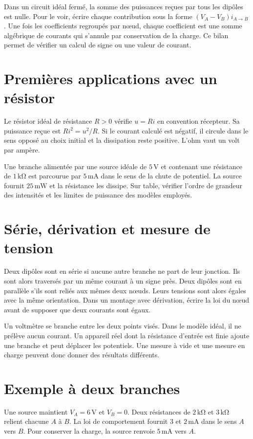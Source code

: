 \documentclass[11pt,a4paper]{article}
\begin{document}
Dans un circuit idéal fermé, la somme des puissances reçues par tous les dipôles est nulle. Pour le voir, écrire chaque contribution sous la forme $(V_A-V_B)i_{A\to B}$. Une fois les coefficients regroupés par nœud, chaque coefficient est une somme algébrique de courants qui s’annule par conservation de la charge. Ce bilan permet de vérifier un calcul de signe ou une valeur de courant.

\section*{Premières applications avec un résistor}
Le résistor idéal de résistance $R>0$ vérifie $u=Ri$ en convention récepteur. Sa puissance reçue est $Ri^2=u^2/R$. Si le courant calculé est négatif, il circule dans le sens opposé au choix initial et la dissipation reste positive. L’ohm vaut un volt par ampère.

Une branche alimentée par une source idéale de $5\,\mathrm V$ et contenant une résistance de $1\,\mathrm{k\Omega}$ est parcourue par $5\,\mathrm{mA}$ dans le sens de la chute de potentiel. La source fournit $25\,\mathrm{mW}$ et la résistance les dissipe. Sur table, vérifier l’ordre de grandeur des intensités et les limites de puissance des modèles employés.

\section*{Série, dérivation et mesure de tension}
Deux dipôles sont en série si aucune autre branche ne part de leur jonction. Ils sont alors traversés par un même courant à un signe près. Deux dipôles sont en parallèle s’ils sont reliés aux mêmes deux nœuds. Leurs tensions sont alors égales avec la même orientation. Dans un montage avec dérivation, écrire la loi du nœud avant de supposer que deux courants sont égaux.

Un voltmètre se branche entre les deux points visés. Dans le modèle idéal, il ne prélève aucun courant. Un appareil réel dont la résistance d’entrée est finie ajoute une branche et peut déplacer les potentiels. Une mesure à vide et une mesure en charge peuvent donc donner des résultats différents.

\section*{Exemple à deux branches}
Une source maintient $V_A=6\,\mathrm V$ et $V_B=0$. Deux résistances de $2\,\mathrm{k\Omega}$ et $3\,\mathrm{k\Omega}$ relient chacune $A$ à $B$. La loi de comportement fournit $3$ et $2\,\mathrm{mA}$ dans le sens $A$ vers $B$. Pour conserver la charge, la source renvoie $5\,\mathrm{mA}$ vers $A$.
\end{document}
